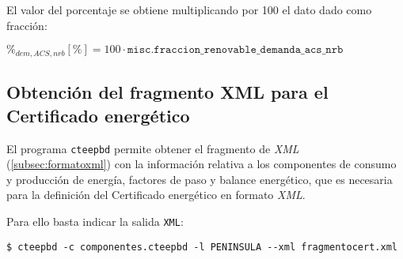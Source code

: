 \documentclass[10pt,notitlepage,oneside,a4paper]{article}
\begin{document}
El valor del porcentaje se obtiene multiplicando por 100 el dato dado como fracción:

$\%_{dem,ACS,nrb} [\%] = 100 \cdot \texttt{misc.fraccion\_renovable\_demanda\_acs\_nrb}$


\subsection{Obtención del fragmento XML para el Certificado energético}

El programa \texttt{cteepbd} permite obtener el fragmento de \textit{XML} (\autoref{subsec:formatoxml}) con la información relativa a los componentes de consumo y producción de energía, factores de paso y balance energético, que es necesaria para la definición del Certificado energético en formato \textit{XML}.

Para ello basta indicar la salida \texttt{XML}:

\begin{Verbatim}[fontsize=\small]
    $ cteepbd -c componentes.cteepbd -l PENINSULA --xml fragmentocert.xml
\end{Verbatim}
\end{document}
